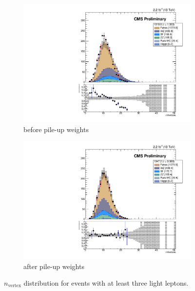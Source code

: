 \begin{figure}[h]
\begin{center}
	\begin{subfigure}[b]{.7\textwidth}
		\includegraphics[width=\textwidth]{Samples/NVERTICES_Tau0-noPileupWeights}
		\caption{before pile-up weights}
	\end{subfigure}
	\begin{subfigure}[b]{.7\textwidth}
		\includegraphics[width=\textwidth]{Samples/NVERTICES_Tau0}
		\caption{after pile-up weights}
	\end{subfigure}
	\caption{$n_\textrm{vertex}$ distribution for events with at least three light leptons.
	\label{fig:pileupWeights}}
\end{center}
\end{figure}

